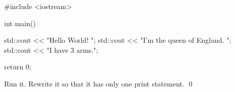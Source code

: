 \begin{console}
#include <iostream>

int main()
{
    std::cout << "Hello World! ";
    std::cout << "I'm the queen of England. ";
    std::cout << "I have 3 arms.";

    return 0;
}
\end{console}
Run it. Rewrite it so that it has only one print statement. 
\qed
